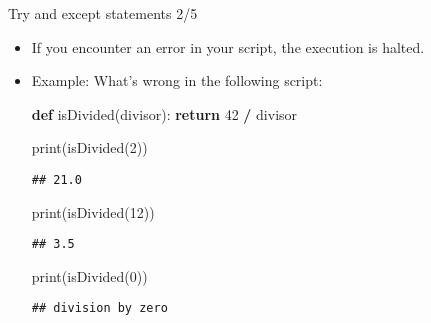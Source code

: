\documentclass[
  8pt,
  ignorenonframetext,
]{beamer}
\newenvironment{Shaded}{\begin{snugshade}}{\end{snugshade}}
\newcommand{\BuiltInTok}[1]{#1}
\newcommand{\ControlFlowTok}[1]{\textcolor[rgb]{0.13,0.29,0.53}{\textbf{#1}}}
\newcommand{\DecValTok}[1]{\textcolor[rgb]{0.00,0.00,0.81}{#1}}
\newcommand{\KeywordTok}[1]{\textcolor[rgb]{0.13,0.29,0.53}{\textbf{#1}}}
\newcommand{\NormalTok}[1]{#1}
\newcommand{\OperatorTok}[1]{\textcolor[rgb]{0.81,0.36,0.00}{\textbf{#1}}}
\begin{document}
\begin{frame}[fragile]{Try and except statements 2/5}
\protect\hypertarget{try-and-except-statements-25}{}
\begin{itemize}
\item
  If you encounter an error in your script, the execution is halted.
\item
  Example: What's wrong in the following script:

\begin{Shaded}
\begin{Highlighting}[]
\KeywordTok{def}\NormalTok{ isDivided(divisor):}
    \ControlFlowTok{return} \DecValTok{42} \OperatorTok{/}\NormalTok{ divisor}

\BuiltInTok{print}\NormalTok{(isDivided(}\DecValTok{2}\NormalTok{))}
\end{Highlighting}
\end{Shaded}

\begin{verbatim}
## 21.0
\end{verbatim}

\begin{Shaded}
\begin{Highlighting}[]
\BuiltInTok{print}\NormalTok{(isDivided(}\DecValTok{12}\NormalTok{))}
\end{Highlighting}
\end{Shaded}

\begin{verbatim}
## 3.5
\end{verbatim}

\begin{Shaded}
\begin{Highlighting}[]
\BuiltInTok{print}\NormalTok{(isDivided(}\DecValTok{0}\NormalTok{))}
\end{Highlighting}
\end{Shaded}

\begin{verbatim}
## division by zero
\end{verbatim}
\end{itemize}
\end{frame}
\end{document}
